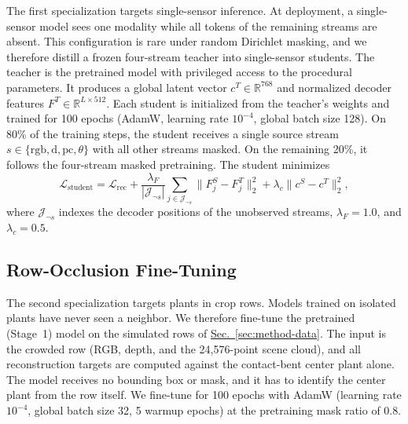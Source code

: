 \documentclass[10pt,twocolumn,letterpaper]{article}
\newcommand{\secref}[1]{\hyperref[#1]{Sec.~\ref*{#1}}}
\providecommand{\R}{\mathbb{R}}
\begin{document}
The first specialization targets single-sensor inference. At deployment, a single-sensor model sees one modality while all tokens of the remaining streams are absent. This configuration is rare under random Dirichlet masking, and we therefore distill a frozen four-stream teacher into single-sensor students. The teacher is the pretrained model with privileged access to the procedural parameters. %
It produces a global latent vector $c^T \in \R^{768}$ and normalized decoder features $F^T \in \R^{L \times 512}$. Each student is initialized from the teacher's weights and trained for 100 epochs (AdamW, learning rate $10^{-4}$, global batch size 128). On 80\% of the training steps, the student receives a single source stream $s \in \{\mathrm{rgb}, \mathrm{d}, \mathrm{pc}, \theta\}$ with all other streams masked. On the remaining 20\%, it follows the four-stream masked pretraining. The student minimizes
\begin{equation}
  \mathcal{L}_{\mathrm{student}} = \mathcal{L}_{\mathrm{rec}} + \frac{\lambda_F}{|\mathcal{J}_{\neg s}|} \sum_{j \in \mathcal{J}_{\neg s}} \|F^S_j - F^T_j\|_2^2 + \lambda_c \|c^S - c^T\|_2^2,
  \label{eq:distillation-loss}
\end{equation}
where $\mathcal{J}_{\neg s}$ indexes the decoder positions of the unobserved streams, $\lambda_F = 1.0$, and $\lambda_c = 0.5$. %


\subsection{Row-Occlusion Fine-Tuning}
\label{sec:method-rows}

The second specialization targets plants in crop rows. Models trained on isolated plants have never seen a neighbor. %
We therefore fine-tune the pretrained (Stage~1) model on the simulated rows of \secref{sec:method-data}. The input is the crowded row (RGB, depth, and the 24{,}576-point scene cloud), and all reconstruction targets are computed against the contact-bent center plant alone. The model receives no bounding box or mask, and it has to identify the center plant from the row itself. We fine-tune for 100 epochs with AdamW (learning rate $10^{-4}$, global batch size 32, 5 warmup epochs) at the pretraining mask ratio of 0.8.
\end{document}
